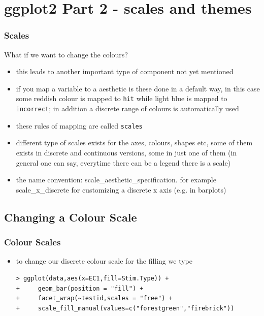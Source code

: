 \documentclass[xcolor={table},c]{beamer}
\begin{document}
\section{ggplot2 Part 2 - scales and themes}


\begin{frame}[fragile]\frametitle{Scales}
What if we want to change the colours?
\begin{itemize}
\item this leads to another important type of component not yet mentioned
\item if you map a variable to a aesthetic is these done in a default way, in this case some reddish colour is mapped to \texttt{hit} while light blue is mapped to \texttt{incorrect}; in addition a discrete range of colours is automatically used
\item these rules of mapping are called \texttt{scales}
\item different type of scales exists for the axes, colours, shapes etc, some of them exists in discrete and continuous versions, some in just one of them (in general one can say, everytime there can be a legend there is a scale)
\item the name convention: scale\_aesthetic\_specification. for example scale\_x\_discrete for customizing a discrete x axis (e.g. in barplots)
\end{itemize}
\end{frame}

\subsection{Changing a Colour Scale}
\begin{frame}[fragile]\frametitle{Colour Scales}
  \begin{itemize}
  \item to change our discrete colour scale for the filling we type \footnotesize
\begin{verbatim}
> ggplot(data,aes(x=EC1,fill=Stim.Type)) +
+     geom_bar(position = "fill") +
+     facet_wrap(~testid,scales = "free") +
+     scale_fill_manual(values=c("forestgreen","firebrick"))
\end{verbatim}
  \end{itemize}
\begin{center}
\end{center}
\end{frame}
\end{document}
